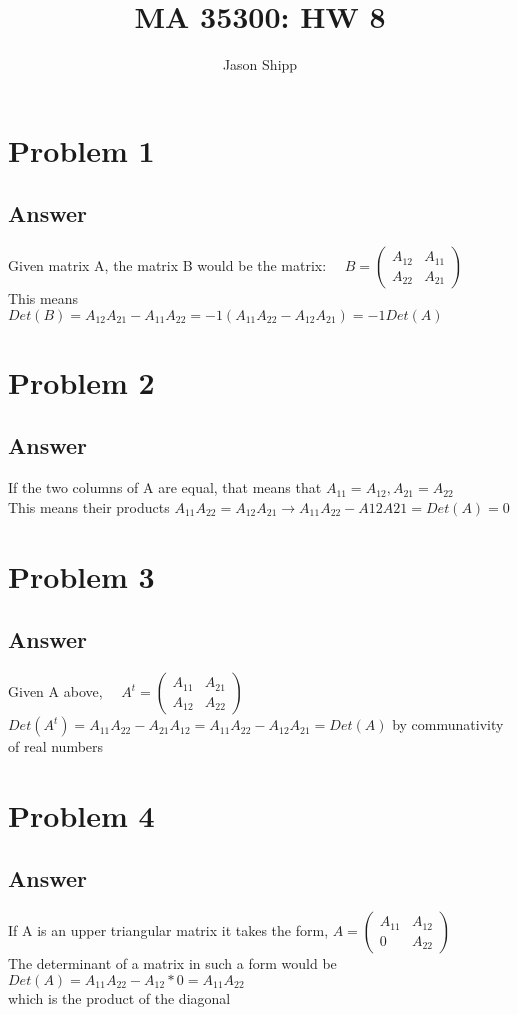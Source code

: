 \documentclass{article}
\begin{document}
\title{MA 35300: HW 8}
\author{Jason Shipp}
\maketitle
\section*{Problem 1}
\subsection*{Answer}
Given matrix A, the matrix B would be the matrix: \(\quad B = \begin{pmatrix}
A_{12} & A_{11} \\
A_{22} & A_{21} \end{pmatrix} \)
\\ This means \(Det(B) = A_{12}A_{21} - A_{11}A_{22} = -1(A_{11}A_{22} - A_{12}A_{21}) = -1Det(A)\)
\section*{Problem 2}
\subsection*{Answer}
If the two columns of A are equal, that means that \(A_{11} = A_{12}, A_{21} = A_{22}\)
\\ This means their products \(A_{11}A_{22} = A_{12}A_{21} \rightarrow A_{11}A_{22} - A{12}A{21} = Det(A) = 0\)
\section*{Problem 3}
\subsection*{Answer}
Given A above, \(\quad A^{t} = \begin{pmatrix}
A_{11} & A_{21} \\
A_{12} & A_{22} \end{pmatrix} \)
\\ \(Det(A^{t}) = A_{11}A_{22} - A_{21}A_{12} = A_{11}A_{22} - A_{12}A_{21} = Det(A)\) by communativity of real numbers
\section*{Problem 4}
\subsection*{Answer}
If A is an upper triangular matrix it takes the form, \(A = \begin{pmatrix} A_{11} & A_{12} \\ 0 & A_{22}\end{pmatrix}\)
\\ The determinant of a matrix in such a form would be \(Det(A) = A_{11}A_{22} - A_{12}*0 = A_{11}A_{22}\) 
\\ which is the product of the diagonal
\end{document}
